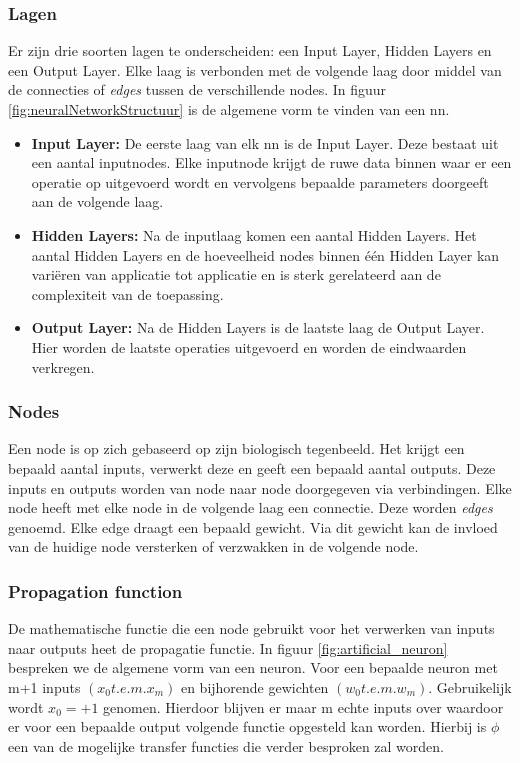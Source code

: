 		\subsubsection{Lagen}
		Er zijn drie soorten lagen te onderscheiden: een Input Layer, Hidden Layers en een Output Layer. Elke laag is verbonden met de volgende laag door middel van de connecties of \textit{edges} tussen de verschillende nodes. In figuur \ref{fig:neuralNetworkStructuur} is de algemene vorm te vinden van een \gls{nn}.
		\begin{itemize}
			\item \textbf{Input Layer:} De eerste laag van elk \gls{nn} is de Input Layer. Deze bestaat uit een aantal inputnodes. Elke inputnode krijgt de ruwe data binnen waar er een operatie op uitgevoerd wordt en vervolgens bepaalde parameters doorgeeft aan de volgende laag. 
			\item \textbf{Hidden Layers:}  Na de inputlaag komen een aantal Hidden Layers. Het aantal Hidden Layers en de hoeveelheid nodes binnen \'e\'en Hidden Layer kan vari\"eren van applicatie tot applicatie en is sterk gerelateerd aan de complexiteit van de toepassing.
			\item \textbf{Output Layer:} Na de Hidden Layers is de laatste laag de Output Layer. Hier worden de laatste operaties uitgevoerd en worden de eindwaarden verkregen.
		\end{itemize}
		
		\subsubsection{Nodes}
		Een node is op zich gebaseerd op zijn biologisch tegenbeeld. Het krijgt een bepaald aantal inputs, verwerkt deze en geeft een bepaald aantal outputs. Deze inputs en outputs worden van node naar node doorgegeven via verbindingen. Elke node heeft met elke node in de volgende laag een connectie. Deze worden \textit{edges} genoemd. Elke edge draagt een bepaald gewicht. Via dit gewicht kan de invloed van de  huidige node versterken of verzwakken in de volgende node.
		
		\subsubsection{Propagation function}
		De mathematische functie die een node gebruikt voor het verwerken van inputs naar outputs heet de propagatie functie.
		In figuur \ref{fig:artificial_neuron} bespreken we de algemene vorm van een neuron. 
		Voor een bepaalde neuron met m+1 inputs $\left(  x_0 t.e.m. x_m \right) $ en bijhorende gewichten $\left(  w_0 t.e.m. w_m \right) $.
		Gebruikelijk wordt $x_0 = +1$ genomen. Hierdoor blijven er maar m echte inputs over waardoor er voor een bepaalde output volgende functie opgesteld kan worden. Hierbij is $\phi$ een van de mogelijke transfer functies die verder besproken zal worden.
		
